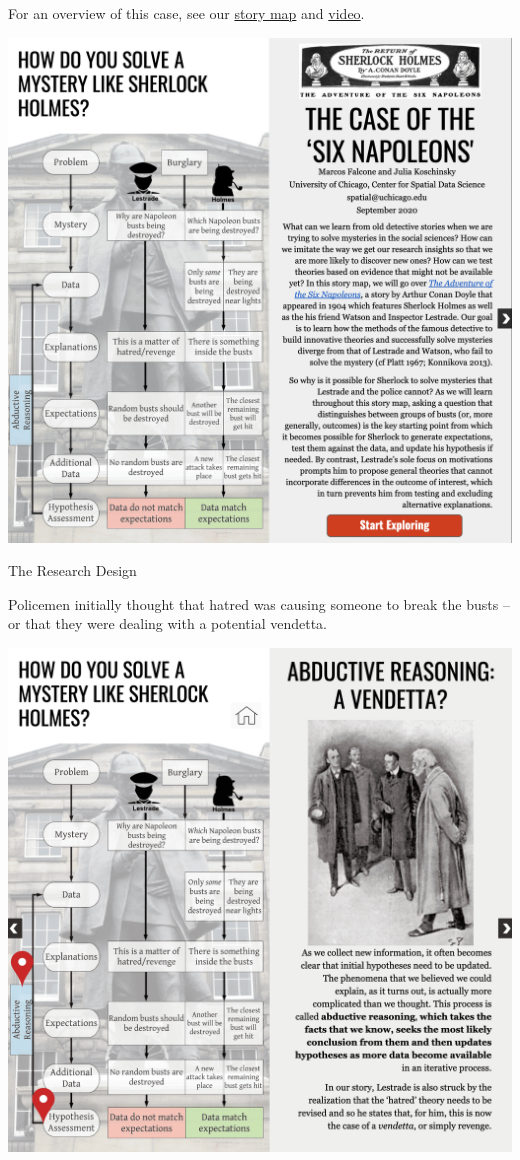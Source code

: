 \documentclass[
]{book}
\begin{document}
For an overview of this case, see our \href{https://docs.google.com/presentation/d/e/2PACX-1vS1ADwo9Uj2JQ-jSqV3Yd1u00FUA33m20NcWvh0qW78axsJ-a-hCMmThFmBjNAyMNnhrcBQVeZxkIB9/pub?start=false\&loop=false\&delayms=3000}{story map} and \href{https://www.youtube.com/watch?v=Fu-4NmiuxJI}{video}.

\includegraphics{images/sherlock2.png}

The Research Design

Policemen initially thought that hatred was causing someone to break the busts -- or that they were dealing with a potential vendetta.

\includegraphics{images/sherlock3.png}
\end{document}
